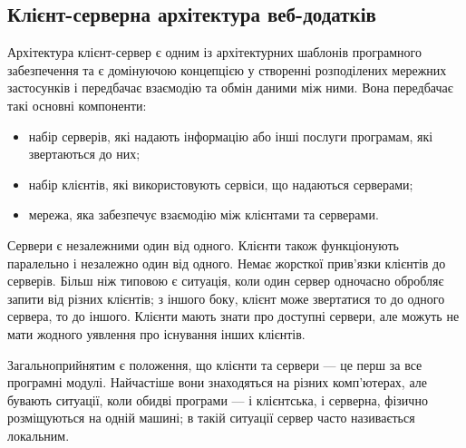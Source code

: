 \subsection{Клієнт-серверна архітектура веб-додатків}

Архітектура клієнт-сервер є одним із архітектурних шаблонів програмного забезпечення та є домінуючою концепцією у створенні розподілених мережних застосунків і передбачає взаємодію та обмін даними між ними. Вона передбачає такі основні компоненти:
\begin{itemize}
	\item набір серверів, які надають інформацію або інші послуги програмам, які звертаються до них;
	\item набір клієнтів, які використовують сервіси, що надаються серверами;
	\item мережа, яка забезпечує взаємодію між клієнтами та серверами.
\end{itemize}

Сервери є незалежними один від одного. Клієнти також функціонують паралельно і незалежно один від одного. Немає жорсткої прив'язки клієнтів до серверів. Більш ніж типовою є ситуація, коли один сервер одночасно обробляє запити від різних клієнтів; з іншого боку, клієнт може звертатися то до одного сервера, то до іншого. Клієнти мають знати про доступні сервери, але можуть не мати жодного уявлення про існування інших клієнтів.

Загальноприйнятим є положення, що клієнти та сервери — це перш за все програмні модулі. Найчастіше вони знаходяться на різних комп'ютерах, але бувають ситуації, коли обидві програми — і клієнтська, і серверна, фізично розміщуються на одній машині; в такій ситуації сервер часто називається локальним.
